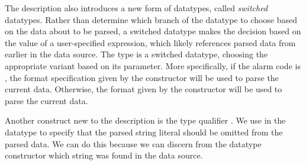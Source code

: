 
The \darkstar{} description also introduces a new form of datatypes,
called \textit{switched} datatypes. Rather than determine which branch
of the datatype to choose based on the data about to be parsed, a
switched datatype makes the decision based on the value of a
user-specified \ocaml{} expression, which likely references parsed
data from earlier in the data source. The  type is a switched
datatype, choosing the appropriate variant based on its
 parameter.  More specifically, if the alarm code is
, the format specification given by the 
constructor will be used to parse the current data.  Otherwise, the
format given by the  constructor will be used to parse the
current data.

Another construct new to the \darkstar{} description is the type qualifier
. We use  in the  datatype to specify
that the parsed string literal should be omitted from the parsed
data. We can do this because we can discern from the datatype constructor
which string was found in the data source.

